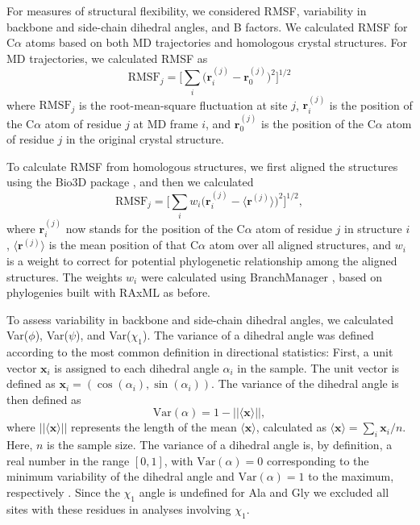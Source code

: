\documentclass[smallextended]{svjour3}
\begin{document}
For measures of structural flexibility, we considered RMSF, variability in backbone and side-chain dihedral angles, and B factors. We calculated RMSF for C$\alpha$ atoms based on both MD trajectories and homologous crystal structures. For MD trajectories, we calculated RMSF as
\begin{equation}
    \text{RMSF}_j = \Big[\sum_i \big(\mathbf{r}_i^{(j)}-\mathbf{r}_0^{(j)}\big)^2\Big]^{1/2}
\end{equation}
where $\text{RMSF}_j$ is the root-mean-square fluctuation at site $j$, $\mathbf{r}_i^{(j)}$ is the position of the C$\alpha$ atom of residue $j$ at MD frame $i$, and $\mathbf{r}_0^{(j)}$ is the position of the C$\alpha$ atom of residue $j$ in the original crystal structure.

To calculate RMSF from homologous structures, we first aligned the structures using the Bio3D package \citep{Grantetal2006}, and then we calculated
\begin{equation}
    \text{RMSF}_j = \Big[\sum_i w_i\big(\mathbf{r}_i^{(j)}-\langle\mathbf{r}^{(j)}\rangle\big)^2\Big]^{1/2},
\end{equation}
where $\mathbf{r}_i^{(j)}$ now stands for the position of the C$\alpha$ atom of residue $j$ in structure $i$, $\langle\mathbf{r}^{(j)}\rangle$ is the mean position of that C$\alpha$ atom over all aligned structures, and $w_i$ is a weight to correct for potential phylogenetic relationship among the aligned structures. The weights $w_i$ were calculated using BranchManager \citep{StoneSidow2007}, based on phylogenies built with RAxML as before.

To assess variability in backbone and side-chain dihedral angles, we calculated Var($\phi$), Var($\psi$), and Var($\chi_1$). The variance of a dihedral angle was defined according to the most common definition in directional statistics:  
First, a unit vector $\mathbf{x}_i$ is assigned to each dihedral angle $\alpha_i$ in the sample. The unit vector is defined as $\mathbf{x}_i = ( \cos (\alpha_i), \sin (\alpha_i) )$.
The variance of the dihedral angle is then defined as
\begin{equation}
\text{Var}(\alpha) = 1 - ||\langle \mathbf{x}\rangle||,
\end{equation}
where $||\langle \mathbf{x}\rangle||$ represents the length of the mean $\langle \mathbf{x}\rangle$, calculated as $\langle \mathbf{x}\rangle=\sum_i \mathbf{x}_i/n$. Here, $n$ is the sample size. The variance of a dihedral angle is, by definition, a real number in the range $[0,1]$, with $\text{Var}(\alpha) = 0$ corresponding to the minimum variability of the dihedral angle and $\text{Var}(\alpha) = 1$ to the maximum, respectively \citep{Berens2009}. Since the $\chi_1$ angle is undefined for Ala and Gly we excluded all sites with these residues in analyses involving $\chi_1$.
\end{document}
